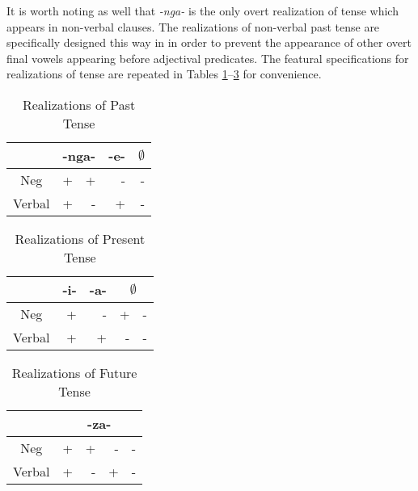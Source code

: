 \documentclass[output=paper]{langsci/langscibook}
\newcommand{\nga}[0]{\textit{-nga- }}
\begin{document}
It is worth noting as well that \nga is the only overt realization of tense which appears in non-verbal clauses. The realizations of non-verbal past tense are specifically designed this way in  in order to prevent the appearance of other overt final vowels appearing before adjectival predicates. The featural specifications for realizations of tense are repeated in Tables \ref{tab:burkholder:6}--\ref{tab:burkholder:8} for convenience. 


\begin{table}
\caption{Realizations of Past Tense} %
\centering %
\begin{tabular}{c| rr|r|r} %
\midrule%
 &\multicolumn{2}{c}{-nga-}& \multicolumn{1}{|c}{-e-}& \multicolumn{1}{|c}{$\emptyset$} \\ [0.5ex] 
\midrule%
Neg & + & + & - & -\\ %
Verbal & + & - & +& -\\[1ex] %
\midrule%
\end{tabular} 
\label{tab:burkholder:6}
\end{table} 





\begin{table}
\caption{Realizations of Present Tense} %
\centering %
\begin{tabular}{c| r|r|rr} %
\midrule%
 &\multicolumn{1}{c}{-i-}& \multicolumn{1}{|c|}{-a-}& \multicolumn{2}{|c}{$\emptyset$} \\ [0.5ex] 
\midrule%
Neg & + & - & + & -\\ %
Verbal & + & + & -& -\\[1ex] %
\midrule%
\end{tabular} 
\label{tab:burkholder:7}
\end{table} 



\begin{table}
\caption{Realizations of Future Tense} %
\centering %
\begin{tabular}{c| rrrr} %
\midrule%
 &\multicolumn{4}{c}{-za-} \\ [0.5ex] 
\midrule%
Neg & + & + & - & -\\ %
Verbal & + & - & +& -\\[1ex] %
\midrule%
\end{tabular} 
\label{tab:burkholder:8}
\end{table} 
\end{document}
